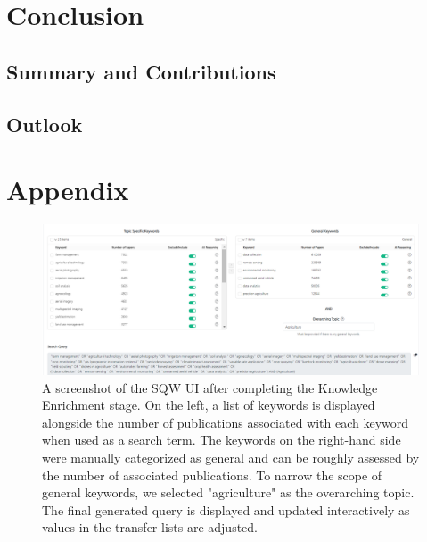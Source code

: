 \documentclass[%
  a4paper,fontsize=11pt,abstract=on,%
  twoside,BCOR=19mm,%
]{scrreprt}
\begin{document}
\chapter{Conclusion}\label{ch:conclusion}
\lipsum[1]
\section{Summary and Contributions}
\lipsum[1-3]
\section{Outlook}
\lipsum[1-3]



\appendix

\chapter{Appendix}

\begin{figure}
	\centering
	\includegraphics[scale=0.35]{pics/sqw-stage1.png}
	\caption[SQW Knowledge Enrichment]{A screenshot of the SQW UI after completing the Knowledge Enrichment stage. On the left, a list of keywords is displayed alongside the number of publications associated with each keyword when used as a search term. The keywords on the right-hand side were manually categorized as general and can be roughly assessed by the number of associated publications. To narrow the scope of general keywords, we selected "agriculture" as the overarching topic. The final generated query is displayed and updated interactively as values in the transfer lists are adjusted.}

	\label{fig:sqw-stage1}
\end{figure}
\end{document}
